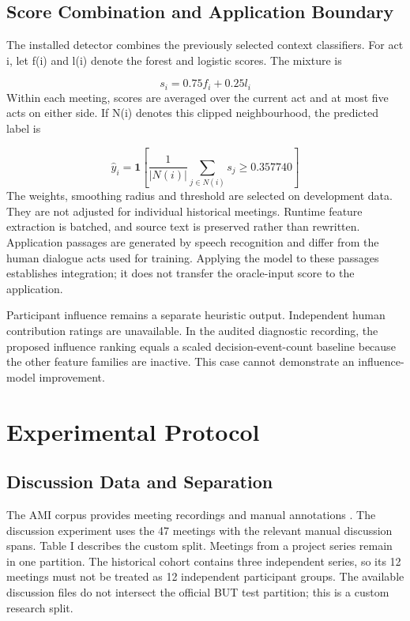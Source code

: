 \documentclass[conference,a4paper]{IEEEtran}
\begin{document}
\subsection{Score Combination and Application Boundary}
The installed detector combines the previously selected context classifiers. For act i, let f(i) and l(i) denote the forest and logistic scores. The mixture is

\begin{equation}s_i=0.75f_i+0.25l_i\end{equation}
Within each meeting, scores are averaged over the current act and at most five acts on either side. If N(i) denotes this clipped neighbourhood, the predicted label is

\begin{equation}\hat y_i=\mathbf{1}\!\left[\frac{1}{|N(i)|}\sum_{j\in N(i)}s_j\geq0.357740\right]\end{equation}
The weights, smoothing radius and threshold are selected on development data. They are not adjusted for individual historical meetings. Runtime feature extraction is batched, and source text is preserved rather than rewritten. Application passages are generated by speech recognition and differ from the human dialogue acts used for training. Applying the model to these passages establishes integration; it does not transfer the oracle-input score to the application.

Participant influence remains a separate heuristic output. Independent human contribution ratings are unavailable. In the audited diagnostic recording, the proposed influence ranking equals a scaled decision-event-count baseline because the other feature families are inactive. This case cannot demonstrate an influence-model improvement.

\section{Experimental Protocol}
\subsection{Discussion Data and Separation}
The AMI corpus provides meeting recordings and manual annotations \cite{ref12}. The discussion experiment uses the 47 meetings with the relevant manual discussion spans. Table I describes the custom split. Meetings from a project series remain in one partition. The historical cohort contains three independent series, so its 12 meetings must not be treated as 12 independent participant groups. The available discussion files do not intersect the official BUT test partition; this is a custom research split.
\end{document}
